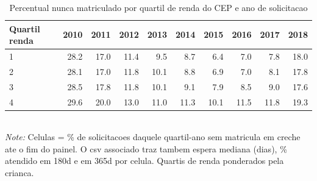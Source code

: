 \begin{table}[htbp]\centering
\caption{Percentual nunca matriculado por quartil de renda do CEP e ano de solicitacao}
\label{tab:T4a_renda}
\small
\setlength{\tabcolsep}{4pt}
\begin{tabular}{lrrrrrrrrr}
\toprule
Quartil renda & 2010 & 2011 & 2012 & 2013 & 2014 & 2015 & 2016 & 2017 & 2018 \\
\midrule
1 & 28.2 & 17.0 & 11.4 & 9.5 & 8.7 & 6.4 & 7.0 & 7.8 & 18.0 \\
2 & 28.1 & 17.0 & 11.8 & 10.1 & 8.8 & 6.9 & 7.0 & 8.1 & 17.8 \\
3 & 28.5 & 17.8 & 11.8 & 10.1 & 9.1 & 7.9 & 8.5 & 9.0 & 17.6 \\
4 & 29.6 & 20.0 & 13.0 & 11.0 & 11.3 & 10.1 & 11.5 & 11.8 & 19.3 \\
\bottomrule
\end{tabular}
\\[3pt]{\footnotesize \textit{Note:} Celulas = \% de solicitacoes daquele quartil-ano sem matricula em creche ate o fim do painel. O csv associado traz tambem espera mediana (dias), \% atendido em 180d e em 365d por celula. Quartis de renda ponderados pela crianca.}
\end{table}
